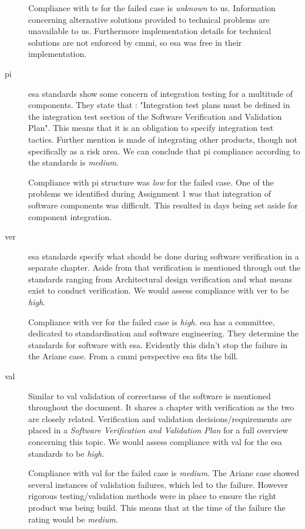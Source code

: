 \begin{description}
Compliance with \ac{ts} for the failed case is \textit{unknown} to us. Information concerning alternative solutions provided to technical problems are unavailable to us. Furthermore implementation details for technical solutions are not enforced by \ac{cmmi}, so \ac{esa} was free in their implementation.

\item[\ac{pi}]
\ac{esa} standards show some concern of integration testing for a multitude of components. They state that \citep[51]{esaSEstandards1991}: "Integration test plans must be defined in the integration test section of the Software Verification and Validation Plan". This means that it is an obligation to specify integration test tactics. Further mention is made of integrating other products, though not specifically as a risk area.
We can conclude that \ac{pi} compliance according to the standards is \textit{medium}.

Compliance with \ac{pi} structure was \textit{low} for the failed case. One of the problems we identified during Assignment 1 was that integration of software components was difficult. This resulted in days being set aside for component integration.

\item[\ac{ver}]
\ac{esa} standards specify what should be done during software verification in a separate chapter. Aside from that verification is mentioned through out the standards ranging from Architectural design verification and what means exist to conduct verification.
We would assess compliance with \ac{ver} to be \textit{high}.

Compliance with \ac{ver} for the failed case is \textit{high}. \ac{esa} has a committee, \citep{esastandardizationBSSC} dedicated to standardisation and software engineering. They determine the standards for software with \ac{esa}. Evidently this didn't stop the failure in the Ariane case. From a \ac{cmmi} perspective \ac{esa} fits the bill.

\item[\ac{val}]
Similar to \ac{val} validation of correctness of the software is mentioned throughout the document. It shares a chapter with verification as the two are closely related.
Verification and validation decisions/requirements are placed in a \textit{Software Verification and Validation Plan} for a full overview concerning this topic.
We would assess compliance with \ac{val} for the \ac{esa} standards to be \textit{high}.

Compliance with \ac{val} for the failed case is \textit{medium}. The Ariane case showed several instances of validation failures, which led to the failure. However rigorous testing/validation methods were in place to ensure the right product was being build. This means that at the time of the failure the rating would be \textit{medium}.

\end{description}

